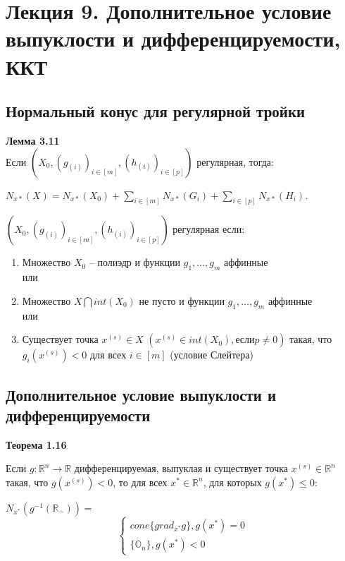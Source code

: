 \section{Лекция 9. Дополнительное условие выпуклости и дифференцируемости, ККТ}

\subsection{Нормальный конус для регулярной тройки}
\textbf{Лемма 3.11}\\
Если $(X_{0},(g_{(i)})_{i\in[m]},(h_{(i)})_{i\in[p]})$ регулярная, тогда:
\begin{center}
    $N_{x*}(X) = N_{x*}(X_{0}) + \sum_{i\in[m]}{N_{x*}(G_{i})} + \sum_{i\in[p]}{N_{x*}(H_{i})}$.\\
\end{center}
$(X_{0},(g_{(i)})_{i\in[m]},(h_{(i)})_{i\in[p]})$ регулярная если:
\begin{enumerate}
    \item Множество $X_{0}$ -- полиэдр и функции $g_{1},\ldots,g_{m}$ аффинные\\ или
    \item Множество $X\bigcap int(X_{0})$ не пусто и функции $g_{1},\ldots,g_{m}$ аффинные\\ или
    \item Существует точка $x^{(s)} \in X$ $(x^{(s)} \in int(X_{0}), если p \neq 0)$ такая, что $g_{i}(x^{(s)}) < 0$ для всех $i\in[m]$ (условие Слейтера)\\
\end{enumerate}


\subsection{Дополнительное условие выпуклости и дифференцируемости}
{\bf Теорема 1.16}

Если $ g: \mathbb{R}^n\rightarrow \mathbb{R}$  дифференцируемая, выпуклая и существует точка $x^{(s)}\in \mathbb{R}^n$ такая, что $g(x^{(s)})<0$, то для всех $x^{*}\in \mathbb{R}^n$, для которых $g(x^{*})\leq 0$:


$N_{x^{*}}(g^{-1}(\mathbb{R_-}))=$
$$\displaystyle
\begin{cases} cone\{grad_{x^*} g\},  g(x^*)=0 \\ \{\mathbb{O}_n\},  g(x^*)<0 \end{cases}$$


